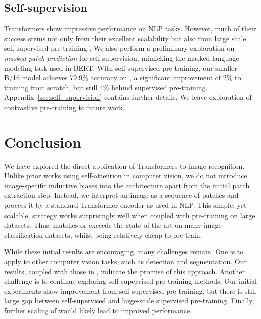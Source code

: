 \subsection{Self-supervision}
Transformers show impressive performance on NLP tasks. However, much of their success stems not only from their excellent scalability but also from large scale self-supervised pre-training \citep{devlin19-bert,radford2018-gpt}. We also perform a preliminary exploration on \textit{masked patch prediction} for self-supervision, mimicking the masked language modeling task used in BERT. With self-supervised pre-training, our smaller \oursabbrv-B/16 model achieves 79.9\% accuracy on \imagenet{}, a significant improvement of 2\% to training from scratch, but still 4\% behind supervised pre-training. Appendix~\ref{sec:self_supervision} contains further details.
We leave exploration of contrastive pre-training \citep{Chen2020simclr,he2020moco,bachman2019amdim,henaff2020cpc} to future work.







\section{Conclusion}

We have explored the direct application of Transformers to image recognition.
Unlike prior works using self-attention in computer vision, we do not introduce image-specific inductive biases into the architecture apart from the initial patch extraction step.
Instead, we interpret an image as a sequence of patches and process it by a standard Transformer encoder as used in NLP.
This simple, yet scalable, strategy works surprisingly well when coupled with pre-training on large datasets.
Thus, \oursfull matches or exceeds the state of the art on many image classification datasets, whilst being relatively cheap to pre-train.

While these initial results are encouraging, many challenges remain.
One is to apply \oursabbrv to other computer vision tasks, such as detection and segmentation.
Our results, coupled with those in \citet{carion20-detr}, indicate the promise of this approach.
Another challenge is to continue exploring self-supervised pre-training methods.
Our initial experiments show improvement from self-supervised pre-training, but there is still large gap between self-supervised and large-scale supervised pre-training.
Finally, further scaling of \oursabbrv{} would likely lead to improved performance.

